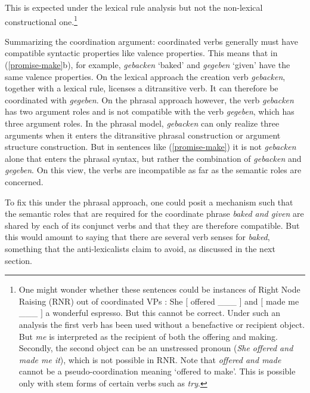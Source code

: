\noindent
This is expected under the lexical rule analysis but not the non-lexical constructional one.\footnote{
One might wonder whether these sentences could be instances of Right Node Raising (RNR) out of coordinated VPs \citep{Bresnan74a-u, Abbott76a-u}:  
\ea \label{rnr}
She $[$ offered  \_\_\_  $]$ and $[$ made me \_\_\_ $]$  a wonderful espresso. 
\z
But this cannot be correct.  
Under such an analysis the first verb has been used without a
benefactive or recipient object.  But \emph{me} is interpreted as the recipient of both the offering and making.
Secondly, the second object can be an unstressed pronoun (\emph{She offered and made me it}), which is not possible in RNR.  Note that \emph{offered and made} cannot be a pseudo-coordination meaning `offered to make'.  This is possible only with stem forms of certain verbs such as \emph{try}.}  

Summarizing the coordination argument:  coordinated verbs generally must have compatible syntactic properties like valence properties.  This means that in (\ref{promise-make}b), for example,
\emph{gebacken} `baked' and \emph{gegeben} `given' have the same valence properties. 
On the lexical approach the creation verb
\emph{gebacken}, together with a lexical rule, licenses a ditransitive verb.  It can therefore be coordinated with \emph{gegeben}. On the phrasal
approach however, the verb \emph{gebacken} has two argument roles and is not compatible with the verb
\emph{gegeben}, which has three argument roles. In the phrasal model, \emph{gebacken} can only realize three arguments when it
enters the ditransitive phrasal construction or argument structure construction.  But in sentences like (\ref{promise-make}) it is not
\emph{gebacken} alone that enters the phrasal syntax, but rather the combination of \emph{gebacken} and
\emph{gegeben}. On this view, the verbs are incompatible as far as the semantic roles are concerned. 

To fix this under the phrasal approach, one could posit a mechanism such that the semantic roles that are required for the coordinate phrase \emph{baked and
  given} %
  are shared by each of its conjunct verbs and that they are therefore compatible.  But this would
  amount to saying that there are several verb senses for \emph{baked}, something that the
  anti-lexicalists claim to avoid, as discussed in the next section.

